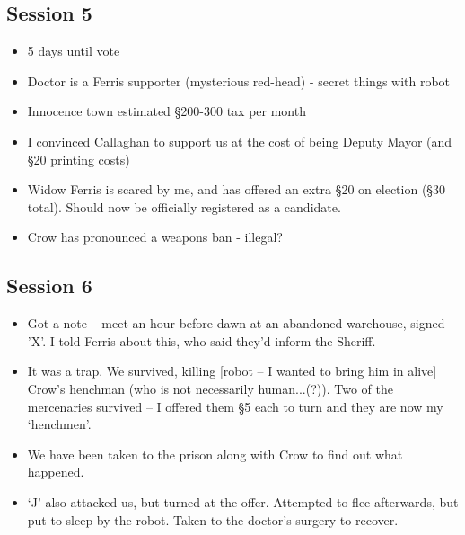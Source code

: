 \documentclass[10pt,a4paper]{article}
\begin{document}
\subsection*{Session 5}

  \begin{itemize}
    \item 5 days until vote
    \item Doctor is a Ferris supporter (mysterious red-head) - secret things with robot
    \item Innocence town estimated §200-300 tax per month
    \item I convinced Callaghan to support us at the cost of being Deputy Mayor (and §20 printing costs)
    \item Widow Ferris is scared by me, and has offered an extra §20 on election (§30 total). Should now be officially registered as a candidate.
    \item Crow has pronounced a weapons ban - illegal?  
  \end{itemize}
  
\subsection*{Session 6}

  \begin{itemize}
    \item Got a note -- meet an hour before dawn at an abandoned warehouse, signed 'X'. I told Ferris about this, who said they'd inform the Sheriff.
    \item It was a trap. We survived, killing [robot -- I wanted to bring him in alive] Crow's henchman (who is not necessarily human...(?)). Two of the mercenaries survived -- I offered them §5 each to turn and they are now my `henchmen'.
    \item We have been taken to the prison along with Crow to find out what happened.
    \item `J' also attacked us, but turned at the offer. Attempted to flee afterwards, but put to sleep by the robot. Taken to the doctor's surgery to recover.
  \end{itemize}
\end{document}
